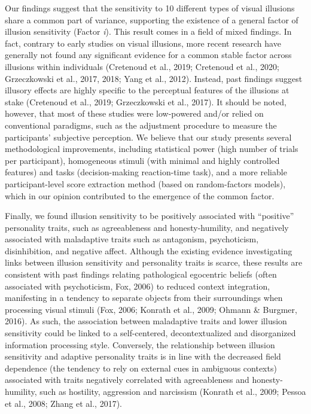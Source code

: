 \documentclass[
  man,floatsintext]{apa6}
\begin{document}
Our findings suggest that the sensitivity to 10 different types of visual illusions share a common part of variance, supporting the existence of a general factor of illusion sensitivity (Factor \emph{i}). This result comes in a field of mixed findings. In fact, contrary to early studies on visual illusions, more recent research have generally not found any significant evidence for a common stable factor across illusions within individuals (Cretenoud et al., 2019; Cretenoud et al., 2020; Grzeczkowski et al., 2017, 2018; Yang et al., 2012). Instead, past findings suggest illusory effects are highly specific to the perceptual features of the illusions at stake (Cretenoud et al., 2019; Grzeczkowski et al., 2017). It should be noted, however, that most of these studies were low-powered and/or relied on conventional paradigms, such as the adjustment procedure to measure the participants' subjective perception. We believe that our study presents several methodological improvements, including statistical power (high number of trials per participant), homogeneous stimuli (with minimal and highly controlled features) and tasks (decision-making reaction-time task), and a more reliable participant-level score extraction method (based on random-factors models), which in our opinion contributed to the emergence of the common factor.

Finally, we found illusion sensitivity to be positively associated with ``positive'' personality traits, such as agreeableness and honesty-humility, and negatively associated with maladaptive traits such as antagonism, psychoticism, disinhibition, and negative affect. Although the existing evidence investigating links between illusion sensitivity and personality traits is scarce, these results are consistent with past findings relating pathological egocentric beliefs (often associated with psychoticism, Fox, 2006) to reduced context integration, manifesting in a tendency to separate objects from their surroundings when processing visual stimuli (Fox, 2006; Konrath et al., 2009; Ohmann \& Burgmer, 2016). As such, the association between maladaptive traits and lower illusion sensitivity could be linked to a self-centered, decontextualized and disorganized information processing style. Conversely, the relationship between illusion sensitivity and adaptive personality traits is in line with the decreased field dependence (the tendency to rely on external cues in ambiguous contexts) associated with traits negatively correlated with agreeableness and honesty-humility, such as hostility, aggression and narcissism (Konrath et al., 2009; Pessoa et al., 2008; Zhang et al., 2017).
\end{document}
